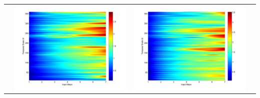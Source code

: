 \documentclass[11pt]{article}
\begin{document}
\begin{table}[H]
{\begin{tabular}{c  c   c   c  }
&\begin{minipage}{.3\textwidth}\includegraphics[width=\linewidth]{resultgraph/06810000pep.png}\end{minipage}
&\begin{minipage}{.3\textwidth}\includegraphics[width=\linewidth]{resultgraph/06810000pepq.png}\end{minipage}
\\

\end{tabular}}
\end{table}
\end{document}
